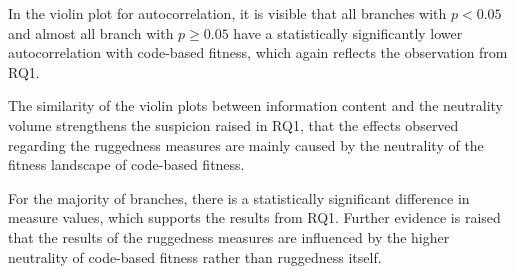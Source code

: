 In the violin plot for autocorrelation, it is visible that all branches with $p < 0.05$ and almost all branch with $p \geq 0.05$ have a statistically significantly lower autocorrelation with code-based fitness, which again reflects the observation from RQ1.

The similarity of the violin plots between information content and the neutrality volume strengthens the suspicion raised in RQ1, that the effects observed regarding the ruggedness measures are mainly caused by the neutrality of the fitness landscape of code-based fitness.


\begin{mdframed}[style=box, frametitle={Summary RQ2:}]
	For the majority of branches, there is a statistically significant difference in measure values, which supports the results from RQ1.
	Further evidence is raised that the results of the ruggedness measures are influenced by the higher neutrality of code-based fitness rather than ruggedness itself.
\end{mdframed}
